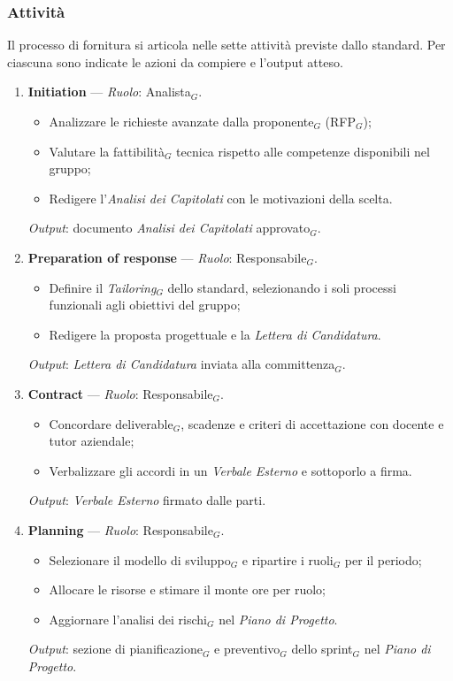\documentclass[a4paper, 10pt]{article}
\begin{document}
\subsubsection{Attività}
Il processo di fornitura si articola nelle sette attività previste dallo standard. Per ciascuna sono indicate le azioni da compiere e l'output atteso.

\begin{enumerate}
    \item \textbf{Initiation} --- \textit{Ruolo}: Analista$_G$.
    \begin{itemize}
        \item Analizzare le richieste avanzate dalla proponente$_G$ (RFP$_G$);
        \item Valutare la fattibilità$_G$ tecnica rispetto alle competenze disponibili nel gruppo;
        \item Redigere l'\textit{Analisi dei Capitolati} con le motivazioni della scelta.
    \end{itemize}
    \textit{Output}: documento \textit{Analisi dei Capitolati} approvato$_G$.

    \item \textbf{Preparation of response} --- \textit{Ruolo}: Responsabile$_G$.
    \begin{itemize}
        \item Definire il \textit{Tailoring$_G$} dello standard, selezionando i soli processi funzionali agli obiettivi del gruppo;
        \item Redigere la proposta progettuale e la \textit{Lettera di Candidatura}.
    \end{itemize}
    \textit{Output}: \textit{Lettera di Candidatura} inviata alla committenza$_G$.

    \item \textbf{Contract} --- \textit{Ruolo}: Responsabile$_G$.
    \begin{itemize}
        \item Concordare deliverable$_G$, scadenze e criteri di accettazione con docente e tutor aziendale;
        \item Verbalizzare gli accordi in un \textit{Verbale Esterno} e sottoporlo a firma.
    \end{itemize}
    \textit{Output}: \textit{Verbale Esterno} firmato dalle parti.

    \item \textbf{Planning} --- \textit{Ruolo}: Responsabile$_G$.
    \begin{itemize}
        \item Selezionare il modello di sviluppo$_G$ e ripartire i ruoli$_G$ per il periodo;
        \item Allocare le risorse e stimare il monte ore per ruolo;
        \item Aggiornare l'analisi dei rischi$_G$ nel \textit{Piano di Progetto}.
    \end{itemize}
    \textit{Output}: sezione di pianificazione$_G$ e preventivo$_G$ dello sprint$_G$ nel \textit{Piano di Progetto}.


\end{enumerate}
\end{document}
